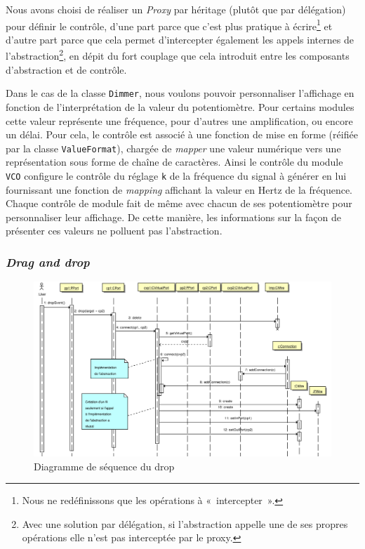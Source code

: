 Nous avons choisi de réaliser un \emph{Proxy} par héritage (plutôt
que par délégation) pour définir le contrôle, d'une part parce que
c'est plus pratique à écrire\footnote{Nous ne redéfinissons que les
opérations à «~intercepter~».} et d'autre part parce que cela permet
d'intercepter également les appels internes de l'abstraction\footnote{Avec
une solution par délégation, si l'abstraction appelle une de ses
propres opérations elle n'est pas interceptée par le
proxy.}, en dépit du fort couplage que cela introduit entre les
composants d'abstraction et de contrôle.

Dans le cas de la classe \verb!Dimmer!, nous voulons pouvoir
personnaliser l'affichage en fonction de l'interprétation de la
valeur du potentiomètre. Pour certains modules cette valeur
représente une fréquence, pour d'autres une amplification, ou
encore un délai. Pour cela, le contrôle est associé à une fonction
de mise en forme (réifiée par la classe \verb!ValueFormat!),
chargée de \emph{mapper} une valeur numérique vers une
représentation sous forme de chaîne de caractères. Ainsi le
contrôle du module \verb!VCO! configure le contrôle du réglage
\verb!k! de la fréquence du signal à générer en lui fournissant une
fonction de \emph{mapping} affichant la valeur en Hertz de la
fréquence. Chaque contrôle de module fait de même avec chacun de
ses potentiomètre pour personnaliser leur affichage. De cette
manière, les informations sur la façon de présenter ces valeurs ne
polluent pas l'abstraction.

\subsubsection{\textit{Drag and drop}}

\begin{figure}[p]
\centering
\includegraphics[width=23cm, angle=90]{../img/ps/drop-sequence.pdf}
\caption{Diagramme de séquence du drop}
\label{drop-sequence}
\end{figure}

